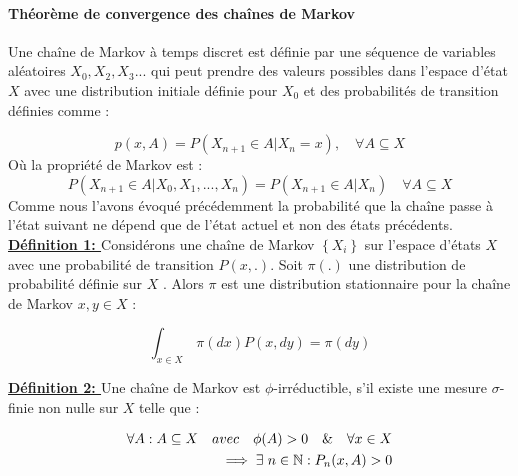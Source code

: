 \paragraph{Théorème de convergence des chaînes de Markov \cite{entezari2018bayesian} \cite{meyn2012markov} \cite{rosenthal2006first} \\}
Une chaîne de Markov à temps discret est définie par une séquence de variables aléatoires \(\displaystyle X_{0}, X_{2}, X_{3} ... \) qui peut prendre des valeurs possibles dans l'espace d'état \(\displaystyle X \) avec une distribution initiale définie pour \(\displaystyle X_{0}\) et des probabilités de transition définies comme :

\begin{equation}
	p(x,A) = P(X_{n+1} \in A | X_{n} = x), \hspace{1em} \forall A \subseteq X
\end{equation}
Où la propriété de Markov est :
\begin{equation}
	P(X_{n+1} \in A | X_{0},X_{1},...,X_{n}) = P(X_{n+1} \in A | X_{n})  \hspace{1em} \forall A \subseteq X
\end{equation}
Comme nous l’avons évoqué précédemment la probabilité que la chaîne passe à l'état suivant ne dépend que de l'état actuel et non des états précédents. \\
\textbf{\underline{Définition 1: }} Considérons une chaîne de Markov \(\displaystyle \left\{ X_{i} \right\} \) sur l'espace d'états \(\displaystyle X \) avec une probabilité de transition \(\displaystyle P(x,.) \). Soit \(\displaystyle \pi (.) \) une distribution de probabilité définie sur \(\displaystyle X \) . Alors \(\displaystyle \pi \) est une distribution stationnaire pour la chaîne de Markov  \(\displaystyle x,y \in X \) :

\begin{equation}
	\int_{x \in X}^{}  \,\pi(dx)P(x,dy) = \pi(dy)
\end{equation}

\noindent \textbf{\underline{Définition 2: }} Une chaîne de Markov est \(\displaystyle \phi \)-irréductible, s'il existe une mesure \(\displaystyle \sigma\)-finie non nulle sur \(\displaystyle X \) telle que :

\begin{equation}
	\begin{split}
	\forall A :  A \subseteq X \hspace{1em} avec \hspace{1em} \phi(A) > 0  \hspace{1em} \&  \hspace{1em} \forall x \in X \\
	\implies \exists \hspace{0.3em} n \in \mathbb{N} : P_{n}(x,A) > 0
	\end{split}
\end{equation}

